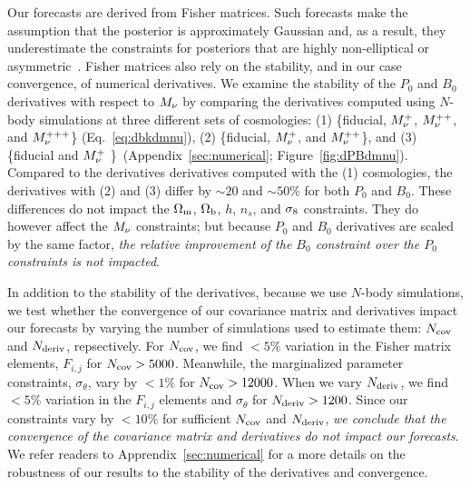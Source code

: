 Our forecasts are derived from Fisher matrices. Such forecasts make 
the assumption that the posterior is approximately Gaussian and, as a result, 
they underestimate the constraints for posteriors that are highly 
non-elliptical or asymmetric~\cite{wolz2012}. Fisher matrices also rely 
on the stability, and in our case convergence, of numerical derivatives. 
We examine the stability of the $P_0$ and $B_0$ derivatives with respect 
to $M_\nu$ by comparing the derivatives computed using $N$-body simulations 
at three different sets of cosmologies: (1) \{fiducial, $M_\nu^{+}$, $M_\nu^{++}$, 
and $M_\nu^{+++}$\} (Eq.~\ref{eq:dbkdmnu}), (2) \{fiducial, $M_\nu^{+}$, 
and $M_\nu^{++}$\}, and (3) \{fiducial and $M_\nu^{+}$ \}~(Appendix~\ref{sec:numerical}; Figure~\ref{fig:dPBdmnu}). 
Compared to the derivatives derivatives computed with the (1) cosmologies, 
the derivatives with (2) and (3) differ by $\sim 20$ and $\sim 50\%$ for 
both $P_0$ and $B_0$. These differences do not impact the $\Omega_{\rm m}$, $\Omega_{\rm b}$, $h$, 
$n_s$, and $\sigma_8$ constraints. They do however affect the $M_\nu$ constraints; 
but because $P_0$ and $B_0$ derivatives are scaled by the same factor, 
{\em the relative improvement of the $B_0$ constraint over the $P_0$ constraints 
is not impacted}. 

In addition to the stability of the derivatives, because we use $N$-body 
simulations, we test whether the convergence of our covariance matrix and 
derivatives impact our forecasts by varying the number of simulations 
used to estimate them: $N_{\rm cov}$ and $N_{\rm deriv}$, repsectively. 
For $N_{\rm cov}$, we find $< 5\%$ variation in the Fisher matrix elements, 
$F_{i,j}$ for $N_{\rm cov} > 5000$. Meanwhile, the marginalized parameter
constraints, $\sigma_\theta$, vary by $< 1\%$ for $N_{\rm cov} > 12000$. 
When we vary $N_{\rm deriv}$, we find $< 5\%$ variation in the $F_{i,j}$ 
elements and $\sigma_\theta$ for $N_{\rm deriv} > 1200$. 
Since our constraints vary by $< 10\%$ for sufficient $N_{\rm cov}$ and 
$N_{\rm deriv}$, {\em we conclude that the convergence of the covariance matrix 
and derivatives do not impact our forecasts}. We refer readers to 
Apprendix~\ref{sec:numerical} for a more details on the robustness of 
our results to the stability of the derivatives and convergence. 

